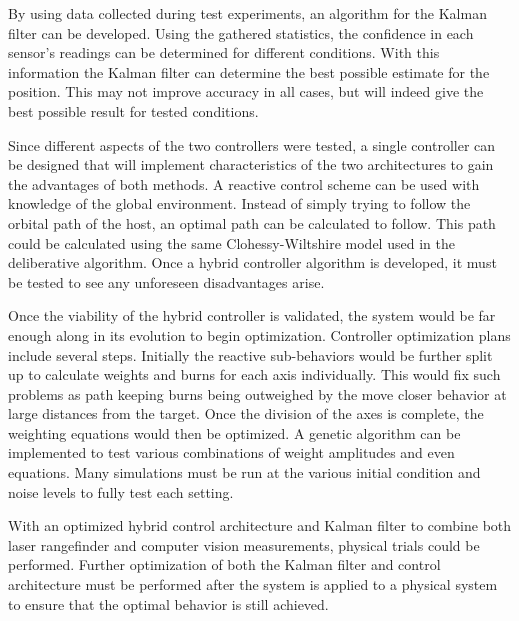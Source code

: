 \documentclass[journal, 10pt]{IEEEtran}
\begin{document}
By using data collected during test experiments, an algorithm for the Kalman filter can be developed.  Using the gathered statistics, the confidence in each sensor's readings can be determined for different conditions.  With this information the Kalman filter can determine the best possible estimate for the position.  This may not improve accuracy in all cases, but will indeed give the best possible result for tested conditions.

Since different aspects of the two controllers were tested, a single controller can be designed that will implement characteristics of the two architectures to gain the advantages of both methods.  A reactive control scheme can be used with knowledge of the global environment.  Instead of simply trying to follow the orbital path of the host, an optimal path can be calculated to follow.  This path could be calculated using the same Clohessy-Wiltshire model used in the deliberative algorithm.  Once a hybrid controller algorithm is developed, it must be tested to see any unforeseen disadvantages arise.

Once the viability of the hybrid controller is validated, the system would be far enough along in its evolution to begin optimization.  Controller optimization plans include several steps.  Initially the reactive sub-behaviors would be further split up to calculate weights and burns for each axis individually.  This would fix such problems as path keeping burns being outweighed by the move closer behavior at large distances from the target.  Once the division of the axes is complete, the weighting equations would then be optimized.  A genetic algorithm can be implemented to test various combinations of weight amplitudes and even equations.  Many simulations must be run at the various initial condition and noise levels to fully test each setting.

With an optimized hybrid control architecture and Kalman filter to combine both laser rangefinder and computer vision measurements, physical trials could be performed.  Further optimization of both the Kalman filter and control architecture must be performed after the system is applied to a physical system to ensure that the optimal behavior is still achieved.


\nocite{*}

{}
\end{document}
